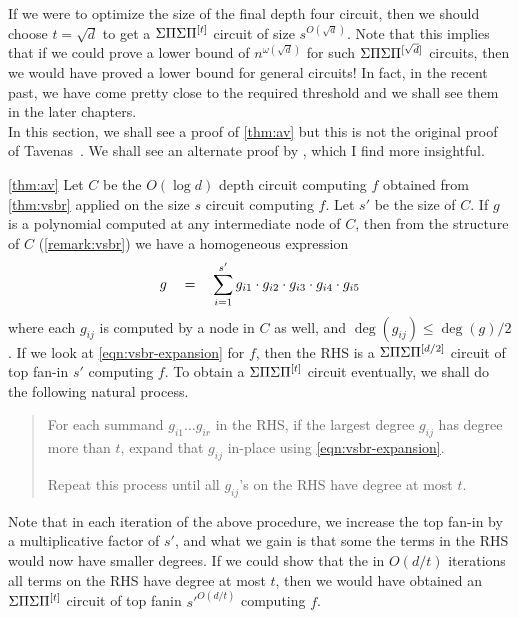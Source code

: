 If we were to optimize the size of the final depth four circuit, then we should choose $t = \sqrt{d}$ to get a $\Sigma\Pi\Sigma\Pi^{[t]}$ circuit of size $s^{O(\sqrt{d})}$. Note that this implies that if we could prove a lower bound of $n^{\omega(\sqrt{d})}$ for such $\Sigma\Pi\Sigma\Pi^{[\sqrt{d}]}$ circuits, then we would have proved a lower bound for general circuits! In fact, in the recent past, we have come pretty close to the required threshold and we shall see them in the later chapters. \\

In this section, we shall see a proof of \autoref{thm:av} but this is not the original proof of Tavenas~\cite{Tav13}. We shall see an alternate proof by \cite{saptharishivinay14}, which I find more insightful. 

\begin{proofof}{\autoref{thm:av}}
Let $C$ be the $O(\log d)$ depth  circuit computing $f$ obtained from \autoref{thm:vsbr} applied on the size $s$ circuit computing $f$. Let $s'$ be the size of $C$. If $g$ is a polynomial computed at any intermediate node of $C$, then from the structure of $C$ (\autoref{remark:vsbr}) we have a homogeneous expression
\begin{equation}\label{eqn:vsbr-expansion}
g \quad = \quad \sum_{i=1}^{s'} g_{i1} \cdot g_{i2} \cdot g_{i3} \cdot g_{i4} \cdot g_{i5} 
\end{equation}
where each $g_{ij}$ is computed by a node in $C$ as well, and $\deg(g_{ij}) \leq \deg(g)/2$. If we look at \eqref{eqn:vsbr-expansion} for $f$, then the RHS is a $\Sigma\Pi\Sigma\Pi^{[d/2]}$ circuit of top fan-in $s'$ computing $f$. To obtain a $\Sigma\Pi\Sigma\Pi^{[t]}$ circuit eventually, we shall do the following natural process. 
\begin{quote}
  For each summand $g_{i1}\dots g_{ir}$ in the RHS, if the largest degree $g_{ij}$ has degree more than $t$, expand that $g_{ij}$ in-place using \eqref{eqn:vsbr-expansion}. 
  
  Repeat this process until all $g_{ij}$'s on the RHS have degree at most $t$. 
\end{quote}

Note that in each iteration of the above procedure, we increase the top fan-in by a multiplicative factor of $s'$, and what we gain is that some the terms in the RHS would now have smaller degrees. If we could show that the in $O(d/t)$  iterations  all terms on the RHS have degree at most $t$, then we would have obtained an $\Sigma\Pi\Sigma\Pi^{[t]}$ circuit of top fanin $s'^{O(d/t)}$ computing $f$. \\


\end{proofof}
